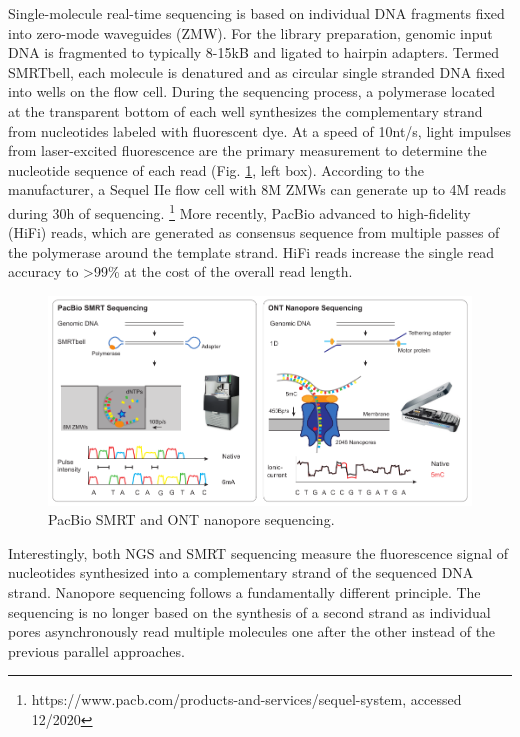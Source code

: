 Single-molecule real-time sequencing is based on individual DNA fragments fixed into zero-mode waveguides (ZMW).
For the library preparation, genomic input DNA is fragmented to typically 8-15kB and ligated to hairpin adapters.
Termed SMRTbell, each molecule is denatured and as circular single stranded DNA fixed into wells on the flow cell.
During the sequencing process, a polymerase located at the transparent bottom of each well synthesizes the complementary strand from nucleotides labeled with fluorescent dye.
At a speed of 10nt/s, light impulses from laser-excited fluorescence are the primary measurement to determine the nucleotide sequence of each read (Fig. \ref{fig:intro:longread}, left box).
According to the manufacturer, a Sequel IIe flow cell with 8M ZMWs can generate up to 4M reads during 30h of sequencing. \footnote{https://www.pacb.com/products-and-services/sequel-system, accessed 12/2020}
More recently, PacBio advanced to high-fidelity (HiFi) reads, which are generated as consensus sequence from multiple passes of the polymerase around the template strand.
HiFi reads increase the single read accuracy to >99\% at the cost of the overall read length.


\begin{figure}[h]
	\centering
	\includegraphics[width=1.0\textwidth]{figures/intro/long_read.pdf}
	\captionsetup{format=plain}
	\caption[Long read sequencing]{PacBio SMRT and ONT nanopore sequencing.}
	\label{fig:intro:longread}
\end{figure}

Interestingly, both NGS and SMRT sequencing measure the fluorescence signal of nucleotides synthesized into a complementary strand of the sequenced DNA strand.
Nanopore sequencing follows a fundamentally different principle.
The sequencing is no longer based on the synthesis of a second strand as individual pores asynchronously read multiple molecules one after the other instead of the previous parallel approaches.


